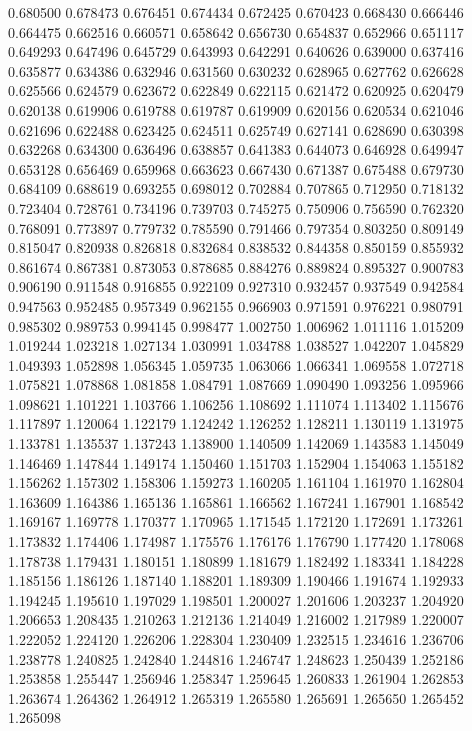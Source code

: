 0.680500
0.678473
0.676451
0.674434
0.672425
0.670423
0.668430
0.666446
0.664475
0.662516
0.660571
0.658642
0.656730
0.654837
0.652966
0.651117
0.649293
0.647496
0.645729
0.643993
0.642291
0.640626
0.639000
0.637416
0.635877
0.634386
0.632946
0.631560
0.630232
0.628965
0.627762
0.626628
0.625566
0.624579
0.623672
0.622849
0.622115
0.621472
0.620925
0.620479
0.620138
0.619906
0.619788
0.619787
0.619909
0.620156
0.620534
0.621046
0.621696
0.622488
0.623425
0.624511
0.625749
0.627141
0.628690
0.630398
0.632268
0.634300
0.636496
0.638857
0.641383
0.644073
0.646928
0.649947
0.653128
0.656469
0.659968
0.663623
0.667430
0.671387
0.675488
0.679730
0.684109
0.688619
0.693255
0.698012
0.702884
0.707865
0.712950
0.718132
0.723404
0.728761
0.734196
0.739703
0.745275
0.750906
0.756590
0.762320
0.768091
0.773897
0.779732
0.785590
0.791466
0.797354
0.803250
0.809149
0.815047
0.820938
0.826818
0.832684
0.838532
0.844358
0.850159
0.855932
0.861674
0.867381
0.873053
0.878685
0.884276
0.889824
0.895327
0.900783
0.906190
0.911548
0.916855
0.922109
0.927310
0.932457
0.937549
0.942584
0.947563
0.952485
0.957349
0.962155
0.966903
0.971591
0.976221
0.980791
0.985302
0.989753
0.994145
0.998477
1.002750
1.006962
1.011116
1.015209
1.019244
1.023218
1.027134
1.030991
1.034788
1.038527
1.042207
1.045829
1.049393
1.052898
1.056345
1.059735
1.063066
1.066341
1.069558
1.072718
1.075821
1.078868
1.081858
1.084791
1.087669
1.090490
1.093256
1.095966
1.098621
1.101221
1.103766
1.106256
1.108692
1.111074
1.113402
1.115676
1.117897
1.120064
1.122179
1.124242
1.126252
1.128211
1.130119
1.131975
1.133781
1.135537
1.137243
1.138900
1.140509
1.142069
1.143583
1.145049
1.146469
1.147844
1.149174
1.150460
1.151703
1.152904
1.154063
1.155182
1.156262
1.157302
1.158306
1.159273
1.160205
1.161104
1.161970
1.162804
1.163609
1.164386
1.165136
1.165861
1.166562
1.167241
1.167901
1.168542
1.169167
1.169778
1.170377
1.170965
1.171545
1.172120
1.172691
1.173261
1.173832
1.174406
1.174987
1.175576
1.176176
1.176790
1.177420
1.178068
1.178738
1.179431
1.180151
1.180899
1.181679
1.182492
1.183341
1.184228
1.185156
1.186126
1.187140
1.188201
1.189309
1.190466
1.191674
1.192933
1.194245
1.195610
1.197029
1.198501
1.200027
1.201606
1.203237
1.204920
1.206653
1.208435
1.210263
1.212136
1.214049
1.216002
1.217989
1.220007
1.222052
1.224120
1.226206
1.228304
1.230409
1.232515
1.234616
1.236706
1.238778
1.240825
1.242840
1.244816
1.246747
1.248623
1.250439
1.252186
1.253858
1.255447
1.256946
1.258347
1.259645
1.260833
1.261904
1.262853
1.263674
1.264362
1.264912
1.265319
1.265580
1.265691
1.265650
1.265452
1.265098

